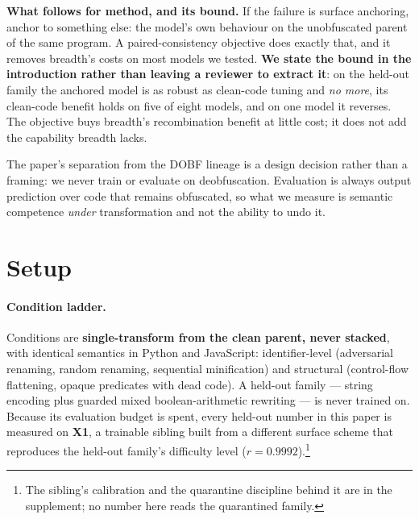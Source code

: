 \documentclass[sigconf,review,anonymous]{acmart}
\begin{document}
\textbf{What follows for method, and its bound.} If the failure is surface anchoring, anchor to
something else: the model's own behaviour on the unobfuscated parent of the same program. A
paired-consistency objective does exactly that, and it removes breadth's costs on most models we
tested. \textbf{We state the bound in the introduction rather than leaving a reviewer to extract
it}: on the held-out family the anchored model is as robust as clean-code tuning and \emph{no more},
its clean-code benefit holds on five of eight models, and on one model it reverses. The objective
buys breadth's recombination benefit at little cost; it does not add the capability breadth lacks.

The paper's separation from the DOBF lineage is a design decision rather than a framing: we never
train or evaluate on deobfuscation. Evaluation is always output prediction over code that remains
obfuscated, so what we measure is semantic competence \emph{under} transformation and not the
ability to undo it.

\section{Setup}
\label{sec:setup}

\paragraph{Condition ladder.} Conditions are \textbf{single-transform from the clean parent, never
stacked}, with identical semantics in Python and JavaScript: identifier-level (adversarial
renaming, random renaming, sequential minification) and structural (control-flow flattening, opaque
predicates with dead code). A held-out family --- string encoding plus guarded mixed
boolean-arithmetic rewriting --- is never trained on. Because its evaluation budget is spent, every
held-out number in this paper is measured on \textbf{X1}, a trainable sibling built from a
different surface scheme that reproduces the held-out family's difficulty level
($r=0.9992$).\footnote{The sibling's calibration and the quarantine discipline behind it are in the
supplement; no number here reads the quarantined family.}
\end{document}
